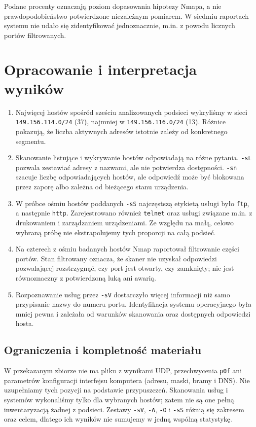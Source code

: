 \documentclass[11pt,a4paper]{article}
\begin{document}
Podane procenty oznaczają poziom dopasowania hipotezy Nmapa, a nie prawdopodobieństwo
potwierdzone niezależnym pomiarem. W siedmiu raportach systemu nie udało się
zidentyfikować jednoznacznie, m.in. z powodu licznych portów filtrowanych.

\section{Opracowanie i interpretacja wyników}
\begin{enumerate}
  \item Najwięcej hostów spośród sześciu analizowanych podsieci wykryliśmy w sieci
        \texttt{149.156.114.0/24} (37), najmniej w \texttt{149.156.116.0/24}
        (13). Różnice pokazują, że liczba aktywnych adresów istotnie zależy od
        konkretnego segmentu.
  \item Skanowanie listujące i wykrywanie hostów odpowiadają na różne pytania.
        \texttt{-sL} pozwala zestawiać adresy z nazwami, ale nie potwierdza
        dostępności. \texttt{-sn} szacuje liczbę odpowiadających hostów, ale
        odpowiedź może być blokowana przez zaporę albo zależna od bieżącego stanu
        urządzenia.
  \item W próbce ośmiu hostów poddanych \texttt{-sS} najczęstszą etykietą usługi
        było \texttt{ftp}, a następnie \texttt{http}. Zarejestrowano również
        \texttt{telnet} oraz usługi związane m.in. z drukowaniem i zarządzaniem
        urządzeniami. Ze względu na małą, celowo wybraną próbę nie ekstrapolujemy
        tych proporcji na całą podsieć.
  \item Na czterech z ośmiu badanych hostów Nmap raportował filtrowanie części
        portów. Stan filtrowany oznacza, że skaner nie uzyskał odpowiedzi
        pozwalającej rozstrzygnąć, czy port jest otwarty, czy zamknięty; nie jest
        równoznaczny z potwierdzoną luką ani awarią.
  \item Rozpoznawanie usług przez \texttt{-sV} dostarczyło więcej informacji
        niż samo przypisanie nazwy do numeru portu. Identyfikacja systemu
        operacyjnego była mniej pewna i zależała od warunków skanowania oraz
        dostępnych odpowiedzi hosta.
\end{enumerate}

\subsection{Ograniczenia i kompletność materiału}
W przekazanym zbiorze nie ma pliku z wynikami UDP, przechwycenia \texttt{p0f}
ani parametrów konfiguracji interfejsu komputera (adresu, maski, bramy i DNS).
Nie uzupełniamy tych pozycji na podstawie przypuszczeń. Skanowania usług i systemów
wykonaliśmy tylko dla wybranych hostów; zatem nie są one pełną inwentaryzacją
żadnej z podsieci. Zestawy \texttt{-sV}, \texttt{-A}, \texttt{-O} i \texttt{-sS}
różnią się zakresem oraz celem, dlatego ich wyników nie sumujemy w jedną wspólną
statystykę.
\end{document}
